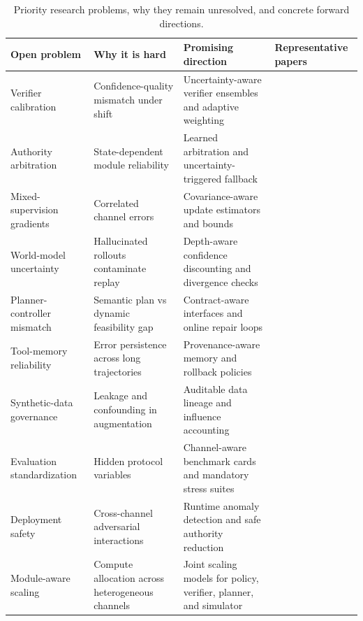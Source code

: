 ﻿\documentclass[conference]{IEEEtran}
\begin{document}
\begin{table}[t]
\centering
\scriptsize
\setlength{\tabcolsep}{3.5pt}
\renewcommand{\arraystretch}{0.96}
\begin{tabularx}{\textwidth}{P{2.1cm}P{2.8cm}P{2.3cm}Y}
\toprule
\textbf{Open problem} & \textbf{Why it is hard} & \textbf{Promising direction} & \textbf{Representative papers}\\
\midrule
Verifier calibration & Confidence-quality mismatch under shift & Uncertainty-aware verifier ensembles and adaptive weighting & \cite{arxiv_p_2602_06493,arxiv_p_2602_12579,arxiv_p_2602_02395}\\
Authority arbitration & State-dependent module reliability & Learned arbitration and uncertainty-triggered fallback & \cite{arxiv_p_2508_03680,arxiv_p_2602_06554,arxiv_p_2601_16486}\\
Mixed-supervision gradients & Correlated channel errors & Covariance-aware update estimators and bounds & \cite{arxiv_p_2602_16165,arxiv_p_2601_06845,arxiv_p_2510_20867}\\
World-model uncertainty & Hallucinated rollouts contaminate replay & Depth-aware confidence discounting and divergence checks & \cite{arxiv_p_2602_02454,arxiv_p_2602_11075,arxiv_p_2602_00785}\\
Planner-controller mismatch & Semantic plan vs dynamic feasibility gap & Contract-aware interfaces and online repair loops & \cite{arxiv_p_2204_01691,arxiv_p_2405_01534,arxiv_p_2512_12716}\\
Tool-memory reliability & Error persistence across long trajectories & Provenance-aware memory and rollback policies & \cite{arxiv_p_2404_03648,arxiv_p_2602_00994,arxiv_p_2601_07264}\\
Synthetic-data governance & Leakage and confounding in augmentation & Auditable data lineage and influence accounting & \cite{arxiv_p_2310_20587,arxiv_p_2601_08107,arxiv_p_2602_02137}\\
Evaluation standardization & Hidden protocol variables & Channel-aware benchmark cards and mandatory stress suites & \cite{arxiv_p_2411_02337,doi_p_10_3390_app14198868,arxiv_p_2510_16720}\\
Deployment safety & Cross-channel adversarial interactions & Runtime anomaly detection and safe authority reduction & \cite{arxiv_p_2512_05686,arxiv_p_2602_09367,arxiv_p_2602_13156}\\
Module-aware scaling & Compute allocation across heterogeneous channels & Joint scaling models for policy, verifier, planner, and simulator & \cite{arxiv_p_2510_06727,arxiv_p_2601_11658,arxiv_p_2509_02547}\\
\bottomrule
\end{tabularx}
\caption{Priority research problems, why they remain unresolved, and concrete forward directions.}
\label{tab:t7_open}
\end{table}
\end{document}
